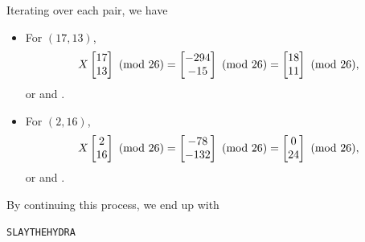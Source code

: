 \documentclass[letterpaper]{article}
\begin{document}
\begin{mdframed}
    \begin{mdframed}
        Iterating over each pair, we have 
        \begin{itemize}
            \item For $(17, 13)$, 
            \[X\begin{bmatrix}
                17 \\ 13
            \end{bmatrix} \ (\mathrm{mod}\ 26) = \begin{bmatrix}
                -294 \\ -15
            \end{bmatrix} \ (\mathrm{mod}\ 26) = \begin{bmatrix}
                18 \\ 11
            \end{bmatrix} \ (\mathrm{mod}\ 26),\]
            or  and . 

            \item For $(2, 16)$, 
            \[X\begin{bmatrix}
                2 \\ 16
            \end{bmatrix} \ (\mathrm{mod}\ 26) = \begin{bmatrix}
                -78 \\ -132
            \end{bmatrix} \ (\mathrm{mod}\ 26) = \begin{bmatrix}
                0 \\ 24
            \end{bmatrix} \ (\mathrm{mod}\ 26),\]
            or  and .
        \end{itemize}
        By continuing this process, we end up with 
        \begin{mdframed}
            \begin{verbatim}
SLAYTHEHYDRA\end{verbatim}
        \end{mdframed}
    \end{mdframed}
\end{mdframed}
\end{document}
